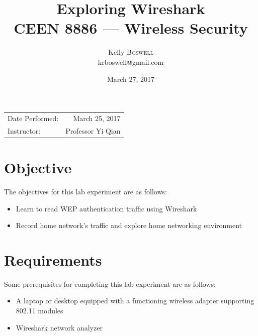 \documentclass{article}
\title{Exploring Wireshark \\ CEEN 8886 --- Wireless Security} %
\author{Kelly \textsc{Boswell} \\ krboswell@gmail.com} %
\date{\Large March 27, 2017} %
\begin{document}
\maketitle %

\begin{center}
\begin{tabular}{l r}
Date Performed: & March 25, 2017 \\ %
Instructor: & Professor Yi Qian %
\end{tabular}
\end{center}



\section{Objective}

The objectives for this lab experiment are as follows:

\begin{itemize}
\item Learn to read WEP authentication traffic using Wireshark
\item Record home network's traffic and explore home networking environment
\end{itemize}


\section{Requirements}

Some prerequisites for completing this lab experiment are as follows:

\begin{itemize}
\item A laptop or desktop equipped with a functioning wireless adapter supporting
      802.11 modules
\item Wireshark network analyzer
\end{itemize}
\end{document}
